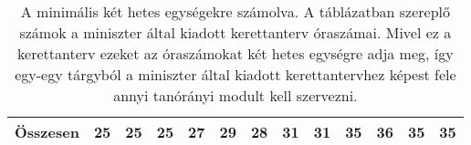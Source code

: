 \begin{landscape}
\begin{table}[]
\begin{tabular}{l|l|l|l|l|l|l|l|l|l|l|l|l}
    \textbf{Összesen}                                   & \textbf{25}                           & \textbf{25} & \textbf{25} & \textbf{27} & \textbf{29} & \textbf{28} & \textbf{31} & \textbf{31} & \textbf{35} & \textbf{36} & \textbf{35} & \textbf{35} \\ \hline
  \end{tabular}
  \caption{A minimális két hetes egységekre számolva. A táblázatban szereplő számok a miniszter által kiadott kerettanterv óraszámai. Mivel ez a kerettanterv ezeket az óraszámokat két hetes egységre adja meg, így egy-egy tárgyból a miniszter által kiadott kerettantervhez képest fele annyi tanórányi modult kell szervezni.}  
  \label{tbl:oraszamok}
\end{table}

\end{landscape}